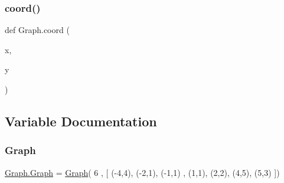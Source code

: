 \subsubsection{\texorpdfstring{coord()}{coord()}}
{\footnotesize\ttfamily def Graph.\+coord (\begin{DoxyParamCaption}\item[{}]{x,  }\item[{}]{y }\end{DoxyParamCaption})}



\subsection{Variable Documentation}
\hypertarget{namespace_graph_a233b6b041f2233754b883f7877a39fbb}{}\label{namespace_graph_a233b6b041f2233754b883f7877a39fbb} 
\subsubsection{\texorpdfstring{Graph}{Graph}}
{\footnotesize\ttfamily \hyperlink{class_graph_1_1_graph}{Graph.\+Graph} = \hyperlink{class_graph_1_1_graph}{Graph}( 6 , \mbox{[} (-\/4,4), (-\/2,1), (-\/1,1) , (1,1), (2,2), (4,5), (5,3) \mbox{]})}


